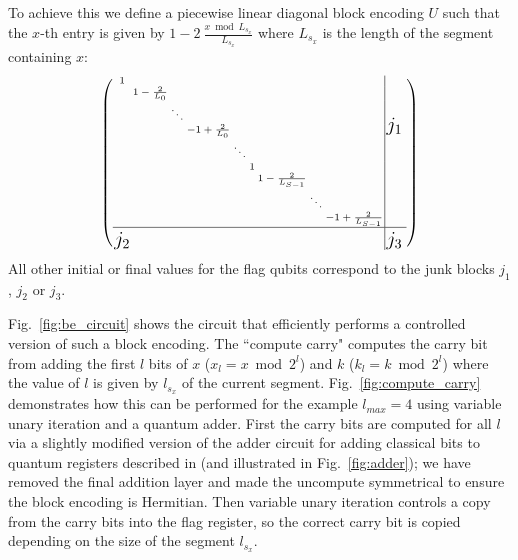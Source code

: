 To achieve this we define a piecewise linear diagonal block encoding $U$ such that the $x$-th entry is given by $1 - 2\>\frac{x \bmod L_{s_x}}{L_{s_x}}$ where $L_{s_x}$ is the length of the segment containing $x$:
\begin{equation}
\scriptsize
\setlength{\arraycolsep}{1pt}
\renewcommand{\arraystretch}{1.0}
\left(
\begin{array}{ccccccccc|cc}
1 &   &   &   &   &   &   &   &   & \multirow{9}{*}{\Large $j_1$} & \\
  & 1 - \frac{2}{L_0} &   &   &   &   &   &   &   &  & \\
  &   & \ddots &   &   &   &   &   &   &  & \\
  &   &   & -1 + \frac{2}{L_0} &   &   &   &   &   &  & \\
  &   &   &   & \ddots &   &   &   &   &  & \\
  &   &   &   &   & 1 &   &   &   &  & \\
  &   &   &   &   &   & 1 - \frac{2}{L_{S-1}} &   &   &  & \\
  &   &   &   &   &   &   & \ddots &   &  & \\
  &   &   &   &   &   &   &   & -1 + \frac{2}{L_{S-1}} &  & \\
\hline
\multirow{2}{*}{\Large $j_2$} &   &   &   &   &   &   &   &   & \multirow{2}{*}{\Large $j_3$} & \\
                              &   &   &   &   &   &   &   &   &  & \\
\end{array}\right)
\end{equation}
 All other initial or final values for the flag qubits correspond to the junk blocks $j_1$, $j_2$ or $j_3$.

Fig.~\ref{fig:be_circuit} shows the circuit that efficiently performs a controlled version of such a block encoding. The ``compute carry" computes the carry bit from adding the first $l$ bits of $x$ ($x_l = x \bmod 2^{l}$) and $k$ ($k_l = k \bmod 2^{l}$) where the value of $l$ is given by $l_{s_x}$ of the current segment. Fig.~\ref{fig:compute_carry} demonstrates how this can be performed for the example $l_{max} =4$ using variable unary iteration and a quantum adder. First the carry bits are computed for all $l$ via a slightly modified version of the adder circuit for adding classical bits to quantum registers described in \cite{Sanders_2020} (and illustrated in Fig.~\ref{fig:adder}); we have removed the final addition layer and made the uncompute symmetrical to ensure the block encoding is Hermitian. Then variable unary iteration \cite{Sanders_2020} controls a copy from the carry bits into the flag register, so the correct carry bit is copied depending on the size of the segment $l_{s_x}$. 

